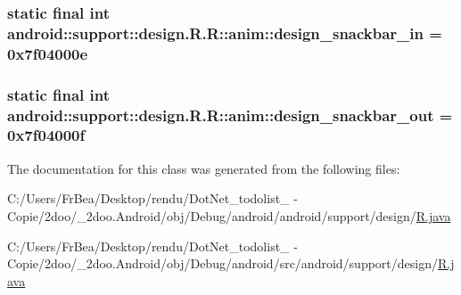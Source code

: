 \hypertarget{classandroid_1_1support_1_1design_1_1_r_1_1anim_925f09683feb54ce1a26bf0e7c37d8da}{
\subsubsection[{design\_\-snackbar\_\-in}]{\setlength{\rightskip}{0pt plus 5cm}static final int android::support::design.R.R::anim::design\_\-snackbar\_\-in = 0x7f04000e}}
\label{classandroid_1_1support_1_1design_1_1_r_1_1anim_925f09683feb54ce1a26bf0e7c37d8da}


\hypertarget{classandroid_1_1support_1_1design_1_1_r_1_1anim_07b70470210eb4b3c2fdf37ad49f70f9}{
\subsubsection[{design\_\-snackbar\_\-out}]{\setlength{\rightskip}{0pt plus 5cm}static final int android::support::design.R.R::anim::design\_\-snackbar\_\-out = 0x7f04000f}}
\label{classandroid_1_1support_1_1design_1_1_r_1_1anim_07b70470210eb4b3c2fdf37ad49f70f9}




The documentation for this class was generated from the following files:\begin{CompactItemize}
\item 
C:/Users/FrBea/Desktop/rendu/DotNet\_\-todolist\_ - Copie/2doo/\_\-2doo.Android/obj/Debug/android/android/support/design/\hyperlink{android_2support_2design_2_r_8java}{R.java}\item 
C:/Users/FrBea/Desktop/rendu/DotNet\_\-todolist\_ - Copie/2doo/\_\-2doo.Android/obj/Debug/android/src/android/support/design/\hyperlink{src_2android_2support_2design_2_r_8java}{R.java}\end{CompactItemize}
